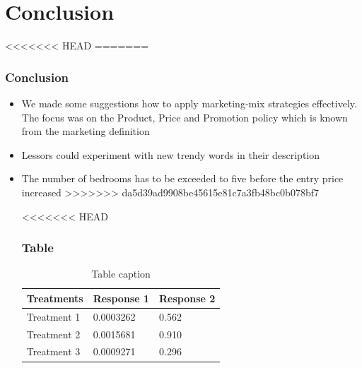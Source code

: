 \documentclass{beamer}
\begin{document}
\section{Conclusion}
<<<<<<< HEAD
=======
\begin{frame}
\frametitle{Conclusion}
\begin{itemize}
\item We made some suggestions how to apply marketing-mix strategies effectively. The focus was on the Product, Price and Promotion policy which is known from the marketing definition
\item Lessors could experiment with new trendy words in their description
\item The number of bedrooms has to be exceeded to five before the entry price increased
>>>>>>> da5d39ad9908be45615e81c7a3fb48bc0b078bf7

\begin{frame}
<<<<<<< HEAD
\frametitle{Table}
\begin{table}
\begin{tabular}{l l l}
\toprule
\textbf{Treatments} & \textbf{Response 1} & \textbf{Response 2}\\
\midrule
Treatment 1 & 0.0003262 & 0.562 \\
Treatment 2 & 0.0015681 & 0.910 \\
Treatment 3 & 0.0009271 & 0.296 \\
\bottomrule
\end{tabular}
\caption{Table caption}
\end{table}
\end{frame}



\end{itemize}
\end{frame}
\end{document}
